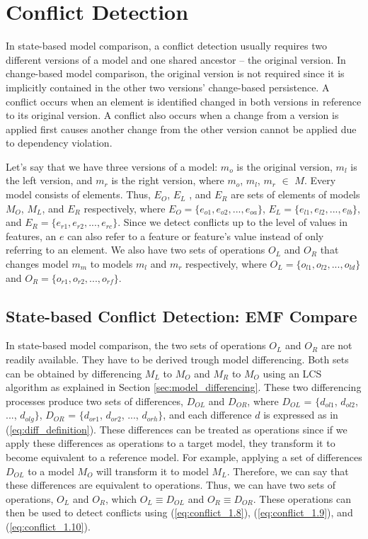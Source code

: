 \section{Conflict Detection}
\label{sec:conflict_detection}
In state-based model comparison, a conflict detection usually requires two different versions of a model and one shared ancestor -- the original version. In change-based model comparison, the original version is not required since it is implicitly contained in the other two versions' change-based persistence. A conflict occurs when an element is identified changed in both versions in reference to its original version. A conflict also occurs when a change from a version is applied first causes another change from the other version cannot be applied due to dependency violation. 

Let's say that we have three versions of a model: $m_{o}$ is the original version, $m_{l}$ is the left version, and $m_{r}$ is the right version, where $m_{o}$, $m_{l}$, $m_{r}$ $\in$ $M$. 
Every model consists of elements. Thus, $E_{O}$, $E_{L}$ , and $E_{R}$ are sets of elements of models $M_{O}$, $M_{L}$, and $E_{R}$ respectively, where $E_{O}=\{e_{o1}, e_{o2}, ..., e_{oa}\}$, $E_{L}=\{e_{l1}, e_{l2}, ..., e_{lb}\}$, and $E_{R}=\{e_{r1}, e_{r2}, ..., e_{rc}\}$. Since we detect conflicts up to the level of values in features, an $e$ can also refer to a feature or feature's value instead of only referring to an element. We also have two sets of operations $O_{L}$ and $O_{R}$ that changes model $m_{m}$ to models $m_{l}$ and $m_{r}$ respectively, where $O_{L}=\{o_{l1}, o_{l2}, ..., o_{ld}\}$ and $O_{R}=\{o_{r1}, o_{r2}, ..., o_{rf}\}$. 

\subsection{State-based Conflict Detection: EMF Compare}
\label{sec:state_based_conflict_detection_emf_compare}
In state-based model comparison, the two sets of operations $O_{L}$ and $O_{R}$ are not readily available. They have to be derived trough model differencing. Both sets can be obtained by differencing $M_{L}$ to $M_{O}$ and $M_{R}$ to $M_{O}$ using an LCS algorithm as explained in Section \ref{sec:model_differencing}. These two differencing processes produce two sets of differences, $D_{OL}$ and $D_{OR}$, where $D_{OL}$ = $\{d_{ol1}$, $d_{ol2}$, ..., $d_{olg}\}$, $D_{OR}$ = $\{d_{or1}$, $d_{or2}$, ..., $d_{orh}\}$, and each difference $d$ is expressed as in (\ref{eq:diff_definition}). These differences can be treated as operations since if we apply these differences as operations to a target model, they transform it to become equivalent to a reference model. For example, applying a set of differences $D_{OL}$ to a model $M_{O}$ will transform it to model $M_{L}$. Therefore, we can say that these differences are equivalent to operations. Thus, we can have two sets of operations, $O_{L}$ and $O_{R}$, which $O_{L} \equiv D_{OL}$ and $O_{R} \equiv D_{OR}$. These operations can then be used to detect conflicts using (\ref{eq:conflict_1.8}), (\ref{eq:conflict_1.9}), and (\ref{eq:conflict_1.10}).  

